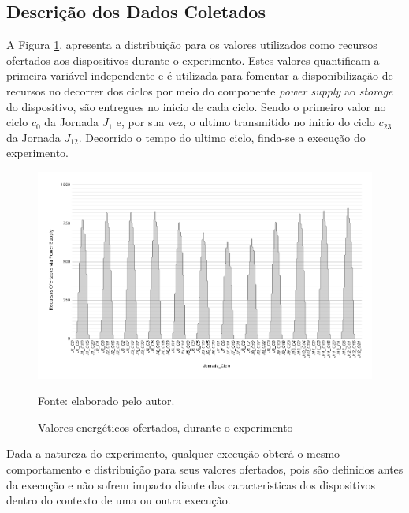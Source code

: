 \subsection{Descrição dos Dados Coletados}

A Figura \ref{fig:cap6valoresofertados}, apresenta a distribuição para os valores utilizados como recursos ofertados aos dispositivos durante o experimento. Estes valores quantificam a primeira variável independente e é utilizada para fomentar a disponibilização de recursos no decorrer dos ciclos por meio do componente \textit{power supply} ao \textit{storage} do dispositivo, são entregues no inicio de cada ciclo. Sendo o primeiro valor no ciclo $c_{0}$ da Jornada $J_1$ e, por sua vez, o ultimo transmitido no inicio do ciclo $c_{23}$ da Jornada $J_{12}$. Decorrido o tempo do ultimo ciclo, finda-se a execução do experimento.

\begin{figure}[H]
	\centering
	
	\caption{Valores energéticos ofertados, durante o experimento} 
	\label{fig:cap6valoresofertados}
	\noindent\includegraphics[width=1\linewidth]{Imagens/cap6/cap6valoresofertados.png} 
	
	Fonte: elaborado pelo autor.
\end{figure}

Dada a natureza do experimento, qualquer execução obterá o mesmo comportamento e distribuição para seus valores ofertados, pois são definidos antes da execução e não sofrem impacto diante das caracteristicas dos dispositivos dentro do contexto de uma ou outra execução.

